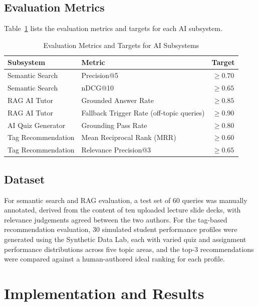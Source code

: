 \documentclass[12pt,a4paper]{report}
\begin{document}
\vspace{10cm}

\subsection{Evaluation Metrics}

Table~\ref{tab:metrics} lists the evaluation metrics and targets for each AI subsystem.

\begin{table}[htbp]
\caption{Evaluation Metrics and Targets for AI Subsystems}
\label{tab:metrics}
\centering
\begin{tabular}{|l|l|c|}
\hline
\textbf{Subsystem} & \textbf{Metric} & \textbf{Target} \\
\hline
Semantic Search & Precision@5 & $\geq 0.70$ \\
Semantic Search & nDCG@10 & $\geq 0.65$ \\
RAG AI Tutor & Grounded Answer Rate & $\geq 0.85$ \\
RAG AI Tutor & Fallback Trigger Rate (off-topic queries) & $\geq 0.90$ \\
AI Quiz Generator & Grounding Pass Rate & $\geq 0.80$ \\
Tag Recommendation & Mean Reciprocal Rank (MRR) & $\geq 0.60$ \\
Tag Recommendation & Relevance Precision@3 & $\geq 0.65$ \\
\hline
\end{tabular}
\end{table}

\subsection{Dataset}

For semantic search and RAG evaluation, a test set of 60 queries was manually annotated, derived from the content of ten uploaded lecture slide decks, with relevance judgements agreed between the two authors. For the tag-based recommendation evaluation, 30 simulated student performance profiles were generated using the Synthetic Data Lab, each with varied quiz and assignment performance distributions across five topic areas, and the top-3 recommendations were compared against a human-authored ideal ranking for each profile.

\vspace{20cm}

\section{Implementation and Results}
\end{document}

